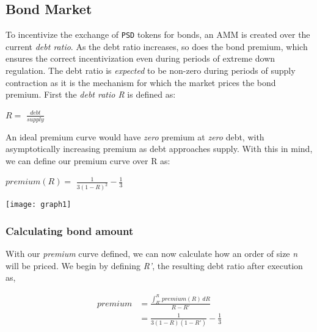 \documentclass[a4paper, 12pt]{article}
\begin{document}
	\subsection{Bond Market}
	To incentivize the exchange of \texttt{PSD} tokens for bonds, an AMM is created over the current \textit{debt ratio}. As the debt ratio increases, so does the bond premium, which ensures the correct 			incentivization even during periods of extreme down regulation.
	The debt ratio is \textit{expected} to be non-zero during periods of supply contraction as it is the mechanism for which the market prices the bond premium.
	First the \textit{debt ratio R} is defined as:

	\begin{center}

		$R = $ \Large{$\frac{debt}{supply}$}

	\end{center}

	An ideal premium curve would have \textit{zero} premium at \textit{zero} debt, with asymptotically increasing premium as debt approaches supply. With this in mind, we can define our premium 			curve over R as:
	
	\begin{center}

		$premium(R) = $ \Large{$\frac{1}{3(1 - R)^2} - \frac{1}{3}$}

	\end{center}

	\begin{center}

		\texttt{[image: graph1]}

	\end{center}

	\subsubsection{Calculating bond amount}
	With our \textit{premium} curve defined, we can now calculate how an order of size \textit{n} will be priced. We begin by defining \textit{R'}, the resulting debt ratio after execution as,
	\begin{center}
		\begin{equation}
		\label{eq1}
			\begin{split}
				premium & = \frac{\int_{R'}^{R} premium(R)\, dR}{R - R'}\\
				& = \frac{1}{3(1 - R)(1 - R')} - \frac{1}{3}
			\end{split}
		\end{equation}
	\end{center}
	
\end{document}
